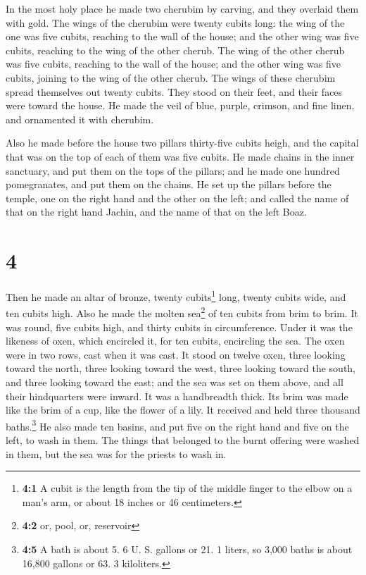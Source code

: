  In the most holy place he made two cherubim by carving,
and they overlaid them with gold.  The wings of the
cherubim were twenty cubits long: the wing of the one was five cubits,
reaching to the wall of the house; and the other wing was five cubits,
reaching to the wing of the other cherub.  The wing of
the other cherub was five cubits, reaching to the wall of the house; and
the other wing was five cubits, joining to the wing of the other cherub.
 The wings of these cherubim spread themselves out twenty
cubits. They stood on their feet, and their faces were toward the house.
 He made the veil of blue, purple, crimson, and fine
linen, and ornamented it with cherubim.

 Also he made before the house two pillars thirty-five
cubits heigh, and the capital that was on the top of each of them was
five cubits.  He made chains in the inner sanctuary, and
put them on the tops of the pillars; and he made one hundred
pomegranates, and put them on the chains.  He set up the
pillars before the temple, one on the right hand and the other on the
left; and called the name of that on the right hand Jachin, and the name
of that on the left Boaz.

\hypertarget{section-3}{%
\section{4}\label{section-3}}

 Then he made an altar of bronze, twenty cubits\footnote{\textbf{4:1}
  A cubit is the length from the tip of the middle finger to the elbow
  on a man's arm, or about 18 inches or 46 centimeters.} long, twenty
cubits wide, and ten cubits high.  Also he made the molten
sea\footnote{\textbf{4:2} or, pool, or, reservoir} of ten cubits from
brim to brim. It was round, five cubits high, and thirty cubits in
circumference.  Under it was the likeness of oxen, which
encircled it, for ten cubits, encircling the sea. The oxen were in two
rows, cast when it was cast.  It stood on twelve oxen,
three looking toward the north, three looking toward the west, three
looking toward the south, and three looking toward the east; and the sea
was set on them above, and all their hindquarters were inward.
 It was a handbreadth thick. Its brim was made like the
brim of a cup, like the flower of a lily. It received and held three
thousand baths.\footnote{\textbf{4:5} A bath is about 5. 6 U. S. gallons
  or 21. 1 liters, so 3,000 baths is about 16,800 gallons or 63. 3
  kiloliters.}  He also made ten basins, and put five on
the right hand and five on the left, to wash in them. The things that
belonged to the burnt offering were washed in them, but the sea was for
the priests to wash in.

